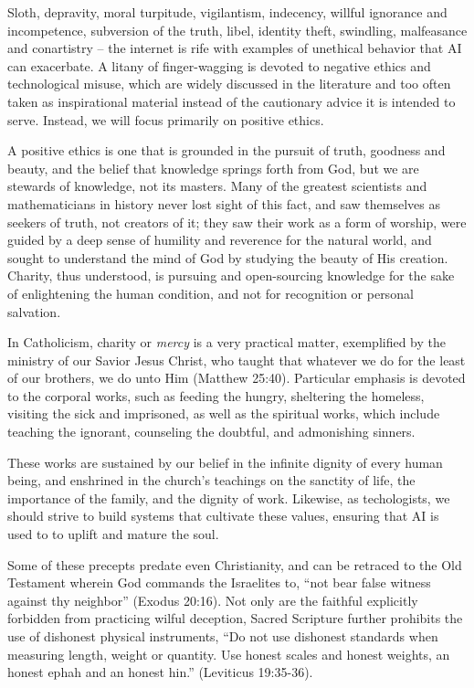 \documentclass[sigplan,nonacm]{acmart}\settopmatter{printfolios=false,printccs=false,printacmref=false}
\begin{document}
  Sloth, depravity, moral turpitude, vigilantism, indecency, willful ignorance and incompetence, subversion of the truth, libel, identity theft, swindling, malfeasance and conartistry -- the internet is rife with examples of unethical behavior that AI can exacerbate. A litany of finger-wagging is devoted to negative ethics and technological misuse, which are widely discussed in the literature and too often taken as inspirational material instead of the cautionary advice it is intended to serve. Instead, we will focus primarily on positive ethics.

  A positive ethics is one that is grounded in the pursuit of truth, goodness and beauty, and the belief that knowledge springs forth from God, but we are stewards of knowledge, not its masters. Many of the greatest scientists and mathematicians in history never lost sight of this fact, and saw themselves as seekers of truth, not creators of it; they saw their work as a form of worship, were guided by a deep sense of humility and reverence for the natural world, and sought to understand the mind of God by studying the beauty of His creation. Charity, thus understood, is pursuing and open-sourcing knowledge for the sake of enlightening the human condition, and not for recognition or personal salvation.

  In Catholicism, charity or \textit{mercy} is a very practical matter, exemplified by the ministry of our Savior Jesus Christ, who taught that whatever we do for the least of our brothers, we do unto Him (Matthew 25:40). Particular emphasis is devoted to the corporal works, such as feeding the hungry, sheltering the homeless, visiting the sick and imprisoned, as well as the spiritual works, which include teaching the ignorant, counseling the doubtful, and admonishing sinners.

  These works are sustained by our belief in the infinite dignity of every human being, and enshrined in the church's teachings on the sanctity of life, the importance of the family, and the dignity of work. Likewise, as techologists, we should strive to build systems that cultivate these values, ensuring that AI is used to to uplift and mature the soul.

  Some of these precepts predate even Christianity, and can be retraced to the Old Testament wherein God commands the Israelites to, ``not bear false witness against thy neighbor'' (Exodus 20:16). Not only are the faithful explicitly forbidden from practicing wilful deception, Sacred Scripture further prohibits the use of dishonest physical instruments, ``Do not use dishonest standards when measuring length, weight or quantity. Use honest scales and honest weights, an honest ephah and an honest hin.'' (Leviticus 19:35-36).
\end{document}
